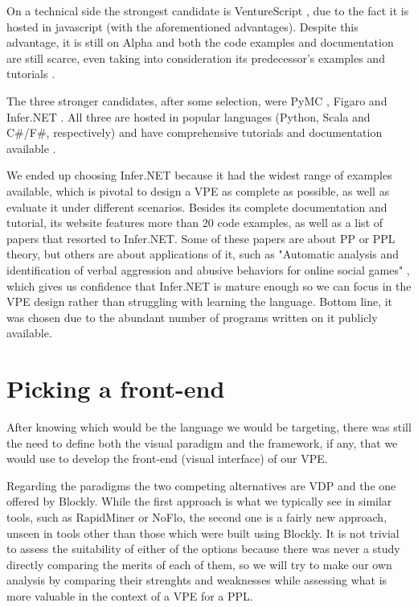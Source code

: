 On a technical side the strongest candidate is VentureScript \cite{probcomp},
due to the fact it is hosted in javascript (with the aforementioned advantages).
Despite this advantage, it is still on Alpha and both the code examples and
documentation are still scarce, even taking into consideration its predecessor's
examples \cite{forestdb} and tutorials \cite{church}.

The three stronger candidates, after some selection, were PyMC \cite{pymc},
Figaro \cite{figaro} and Infer.NET \cite{InferNET14}. All three are hosted in popular languages
(Python, Scala and C#/F#, respectively) and have comprehensive tutorials and
documentation available \cite{pymct}\cite{figarot}\cite{InferNET14t}.

We ended up choosing Infer.NET because it had the widest range of examples
available, which is pivotal to design a VPE as complete as possible, as well
as evaluate it under different scenarios. Besides its complete documentation
and tutorial, its website features more than 20 code examples, as well as a list
of papers that resorted to Infer.NET. Some of these papers are about PP or PPL theory,
but others are about applications of it, such as "Automatic analysis and
identification of verbal aggression and abusive behaviors for online social
games" \cite{balci2015automatic}, which gives us confidence that Infer.NET is
mature enough so we can focus in the VPE design rather than struggling with
learning the language. Bottom line, it was chosen due to the abundant number of
programs written on it publicly available.

\section{Picking a front-end}

After knowing which would be the language we would be targeting, there was still
the need to define both the visual paradigm and the framework, if any, that we
would use to develop the front-end (visual interface) of our VPE.

Regarding the paradigms the two competing alternatives are VDP and the one offered
by Blockly. While the first approach is what we typically see in similar tools,
such as RapidMiner or NoFlo, the second one is a fairly new approach, unseen
in tools other than those which were built using Blockly. It is not trivial to
assess the suitability of either of the options because there was never a study
directly comparing the merits of each of them, so we will try to make our own
analysis by comparing their strenghts and weaknesses while assessing what is
more valuable in the context of a VPE for a PPL.

